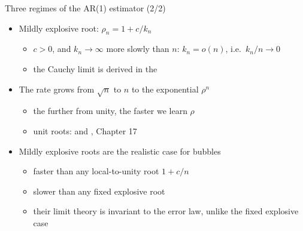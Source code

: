\begin{frame}{Three regimes of the AR(1) estimator (2/2)}
\itemsize{\small}
\begin{itemize}
    \item Mildly explosive root: $\rho_n = 1 + c/k_n$
    \begin{itemize}
        \item $c > 0$, and $k_n \to \infty$ more slowly than $n$: $k_n = o(n)$, i.e.\ $k_n/n \to 0$
        \item the Cauchy limit is derived in the  %
    \end{itemize}
    \item The rate grows from $\sqrt n$ to $n$ to the exponential $\rho^n$
    \begin{itemize}
        \item the further from unity, the faster we learn $\rho$
        \item unit roots:  and , Chapter 17
    \end{itemize}
    \item Mildly explosive roots are the realistic case for bubbles
    \begin{itemize}
        \item faster than any local-to-unity root $1 + c/n$
        \item slower than any fixed explosive root
        \item their limit theory is invariant to the error law, unlike the fixed explosive case
    \end{itemize}
\end{itemize}
\end{frame}

